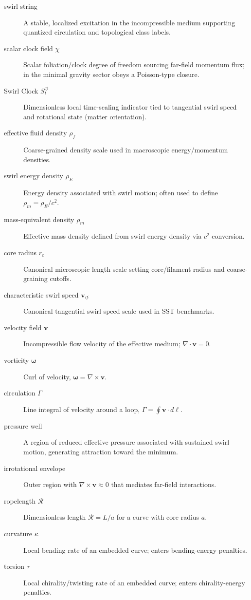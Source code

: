 \documentclass[10pt]{article}
\begin{document}
\begin{description}
\item[swirl string] A stable, localized excitation in the incompressible medium supporting quantized circulation and topological class labels.
\item[scalar clock field $\chi$] Scalar foliation/clock degree of freedom sourcing far-field momentum flux; in the minimal gravity sector obeys a Poisson-type closure.
\item[Swirl Clock $S_t^{\boldsymbol{\circlearrowleft}}$] Dimensionless local time-scaling indicator tied to tangential swirl speed and rotational state (matter orientation).
\item[effective fluid density $\rho_{\!f}$] Coarse-grained density scale used in macroscopic energy/momentum densities.
\item[swirl energy density $\rho_{\!E}$] Energy density associated with swirl motion; often used to define $\rho_{\!m}=\rho_{\!E}/c^2$.
\item[mass-equivalent density $\rho_{\!m}$] Effective mass density defined from swirl energy density via $c^2$ conversion.
\item[core radius $r_c$] Canonical microscopic length scale setting core/filament radius and coarse-graining cutoffs.
\item[characteristic swirl speed $\mathbf{v}_{\!\boldsymbol{\circlearrowleft}}$] Canonical tangential swirl speed scale used in SST benchmarks.
\item[velocity field $\mathbf{v}$] Incompressible flow velocity of the effective medium; $\nabla\cdot\mathbf{v}=0$.
\item[vorticity $\boldsymbol{\omega}$] Curl of velocity, $\boldsymbol{\omega}=\nabla\times\mathbf{v}$.
\item[circulation $\Gamma$] Line integral of velocity around a loop, $\Gamma=\oint \mathbf{v}\cdot d\boldsymbol{\ell}$.
\item[pressure well] A region of reduced effective pressure associated with sustained swirl motion, generating attraction toward the minimum.
\item[irrotational envelope] Outer region with $\nabla\times\mathbf{v}\approx 0$ that mediates far-field interactions.
\item[ropelength $\mathcal{R}$] Dimensionless length $\mathcal{R}=L/a$ for a curve with core radius $a$.
\item[curvature $\kappa$] Local bending rate of an embedded curve; enters bending-energy penalties.
\item[torsion $\tau$] Local chirality/twisting rate of an embedded curve; enters chirality-energy penalties.

\end{description}
\end{document}
